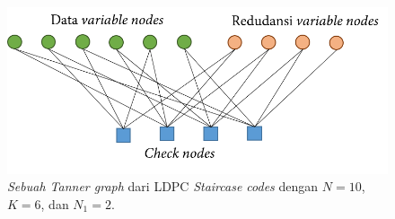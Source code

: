 \begin{figure}[t!]
	\centering
	\includegraphics[scale=0.9]
	{pics/staircase.png}
	\caption{\textit{Sebuah Tanner graph} dari LDPC \textit{Staircase codes} dengan $N=10$, $K=6$, dan $N_{1}=2$.}
	\label{fig:Tanner Graph LDPC Staircase codes}
\end{figure}


%
%
